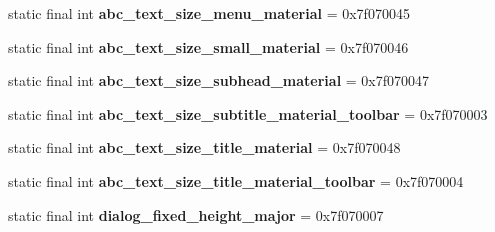 \begin{DoxyCompactItemize}
\item 
\hypertarget{classandroid_1_1support_1_1v7_1_1appcompat_1_1_r_1_1dimen_a013dbf6cc3ed277e44042ef75aac53a0}{}static final int {\bfseries abc\+\_\+text\+\_\+size\+\_\+menu\+\_\+material} = 0x7f070045\label{classandroid_1_1support_1_1v7_1_1appcompat_1_1_r_1_1dimen_a013dbf6cc3ed277e44042ef75aac53a0}

\item 
\hypertarget{classandroid_1_1support_1_1v7_1_1appcompat_1_1_r_1_1dimen_ada53ec83d3d0880e3b4c1f120c5c7907}{}static final int {\bfseries abc\+\_\+text\+\_\+size\+\_\+small\+\_\+material} = 0x7f070046\label{classandroid_1_1support_1_1v7_1_1appcompat_1_1_r_1_1dimen_ada53ec83d3d0880e3b4c1f120c5c7907}

\item 
\hypertarget{classandroid_1_1support_1_1v7_1_1appcompat_1_1_r_1_1dimen_a53289079c21fcd186a4164e9b2f2da99}{}static final int {\bfseries abc\+\_\+text\+\_\+size\+\_\+subhead\+\_\+material} = 0x7f070047\label{classandroid_1_1support_1_1v7_1_1appcompat_1_1_r_1_1dimen_a53289079c21fcd186a4164e9b2f2da99}

\item 
\hypertarget{classandroid_1_1support_1_1v7_1_1appcompat_1_1_r_1_1dimen_a5bf6baa53b8c1682126087a919610d01}{}static final int {\bfseries abc\+\_\+text\+\_\+size\+\_\+subtitle\+\_\+material\+\_\+toolbar} = 0x7f070003\label{classandroid_1_1support_1_1v7_1_1appcompat_1_1_r_1_1dimen_a5bf6baa53b8c1682126087a919610d01}

\item 
\hypertarget{classandroid_1_1support_1_1v7_1_1appcompat_1_1_r_1_1dimen_a44d7dca8af02a27a8d1dd74e7227c7b3}{}static final int {\bfseries abc\+\_\+text\+\_\+size\+\_\+title\+\_\+material} = 0x7f070048\label{classandroid_1_1support_1_1v7_1_1appcompat_1_1_r_1_1dimen_a44d7dca8af02a27a8d1dd74e7227c7b3}

\item 
\hypertarget{classandroid_1_1support_1_1v7_1_1appcompat_1_1_r_1_1dimen_af12b0fa15cc97e0cad7d4b0bebdd7aae}{}static final int {\bfseries abc\+\_\+text\+\_\+size\+\_\+title\+\_\+material\+\_\+toolbar} = 0x7f070004\label{classandroid_1_1support_1_1v7_1_1appcompat_1_1_r_1_1dimen_af12b0fa15cc97e0cad7d4b0bebdd7aae}

\item 
\hypertarget{classandroid_1_1support_1_1v7_1_1appcompat_1_1_r_1_1dimen_abd09a787beff15931762bd5178d13e9b}{}static final int {\bfseries dialog\+\_\+fixed\+\_\+height\+\_\+major} = 0x7f070007\label{classandroid_1_1support_1_1v7_1_1appcompat_1_1_r_1_1dimen_abd09a787beff15931762bd5178d13e9b}


\end{DoxyCompactItemize}
